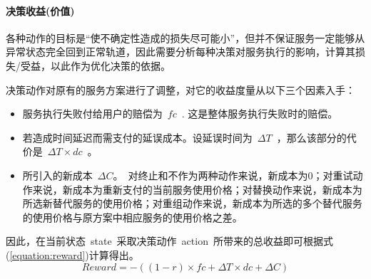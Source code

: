 
\paragraph{决策收益(价值)}

各种动作的目标是“使不确定性造成的损失尽可能小”，但并不保证服务一定能够从异常状态完全回到正常轨道，因此需要分析每种决策对服务执行的影响，计算其损失/受益，以此作为优化决策的依据。

决策动作对原有的服务方案进行了调整，对它的收益度量从以下三个因素入手：

\begin{itemize}

\item 服务执行失败付给用户的赔偿为~$fc$~. 这是整体服务执行失败时的赔偿。

\item 若造成时间延迟而需支付的延误成本。设延误时间为~$\Delta T$~，那么该部分的代价是~$\Delta T \times dc$~。

\item 所引入的新成本~$\Delta C$。~对终止和不作为两种动作来说，新成本为0；对重试动作来说，新成本为重新支付的当前服务使用价格；对替换动作来说，新成本为所选新替代服务的使用价格；对重组动作来说，新成本为所选的多个替代服务的使用价格与原方案中相应服务的使用价格之差。

\end{itemize}

因此，在当前状态~state~采取决策动作~action~所带来的总收益即可根据式(\ref{equation:reward})计算得出。
\begin{equation}\label{equation:reward}
Reward =  - ((1 - r) \times fc + \Delta T \times dc + \Delta C)
\end{equation}

